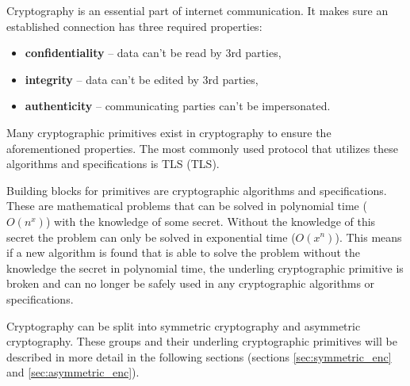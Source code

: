 
Cryptography is an essential part of internet communication. It makes sure an established connection has three required properties\cite{Bernstein149}:
\begin{itemize}
  \item \textbf{confidentiality} -- data can't be read by 3rd parties,
  \item \textbf{integrity} -- data can't be edited by 3rd parties,
  \item \textbf{authenticity} -- communicating parties can't be impersonated.
\end{itemize}
Many cryptographic primitives exist in cryptography to ensure the aforementioned properties. The most commonly used protocol that utilizes these algorithms and specifications is TLS (\acl{TLS}).

Building blocks for primitives are cryptographic algorithms and specifications. These are mathematical problems that can be solved in polynomial time ($O(n^x)$) with the knowledge of some secret. Without the knowledge of this secret the problem can only be solved in exponential time ($O(x^n)$). This means if a new algorithm is found that is able to solve the problem without the knowledge the secret in polynomial time, the underling cryptographic primitive is broken and can no longer be safely used in any cryptographic algorithms or specifications.\cite{Smart2004}

Cryptography can be split into symmetric cryptography and asymmetric cryptography. These groups and their underling cryptographic primitives will be described in more detail in the following sections (sections \ref{sec:symmetric_enc} and \ref{sec:asymmetric_enc}).
